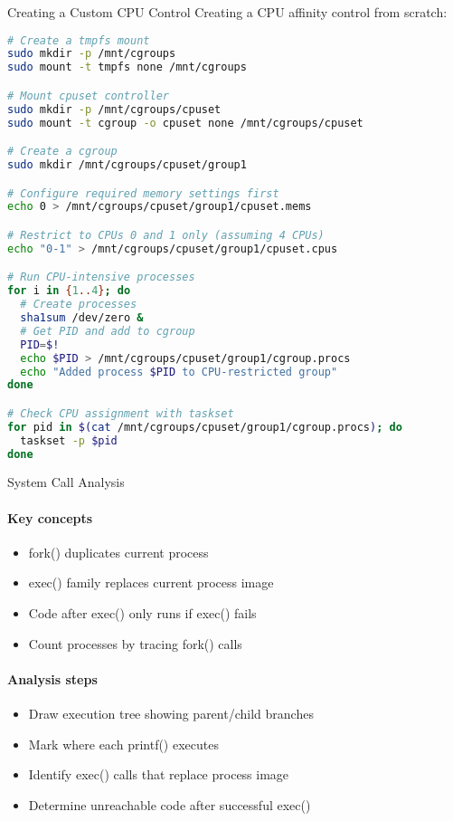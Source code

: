\begin{example2}{Creating a Custom CPU Control}
    Creating a CPU affinity control from scratch:
    
\begin{lstlisting}[language=bash, style=basesmol]
# Create a tmpfs mount
sudo mkdir -p /mnt/cgroups
sudo mount -t tmpfs none /mnt/cgroups

# Mount cpuset controller
sudo mkdir -p /mnt/cgroups/cpuset
sudo mount -t cgroup -o cpuset none /mnt/cgroups/cpuset

# Create a cgroup
sudo mkdir /mnt/cgroups/cpuset/group1

# Configure required memory settings first
echo 0 > /mnt/cgroups/cpuset/group1/cpuset.mems

# Restrict to CPUs 0 and 1 only (assuming 4 CPUs)
echo "0-1" > /mnt/cgroups/cpuset/group1/cpuset.cpus

# Run CPU-intensive processes
for i in {1..4}; do
  # Create processes
  sha1sum /dev/zero &
  # Get PID and add to cgroup
  PID=$!
  echo $PID > /mnt/cgroups/cpuset/group1/cgroup.procs
  echo "Added process $PID to CPU-restricted group"
done

# Check CPU assignment with taskset
for pid in $(cat /mnt/cgroups/cpuset/group1/cgroup.procs); do
  taskset -p $pid
done
\end{lstlisting}
\end{example2}

\begin{KR}{System Call Analysis}
    \paragraph{Key concepts}
    \begin{itemize}
        \item fork() duplicates current process
        \item exec() family replaces current process image
        \item Code after exec() only runs if exec() fails
        \item Count processes by tracing fork() calls
    \end{itemize}
    
    \paragraph{Analysis steps}
    \begin{itemize}
        \item Draw execution tree showing parent/child branches
        \item Mark where each printf() executes
        \item Identify exec() calls that replace process image
        \item Determine unreachable code after successful exec()
    \end{itemize}
\end{KR}

